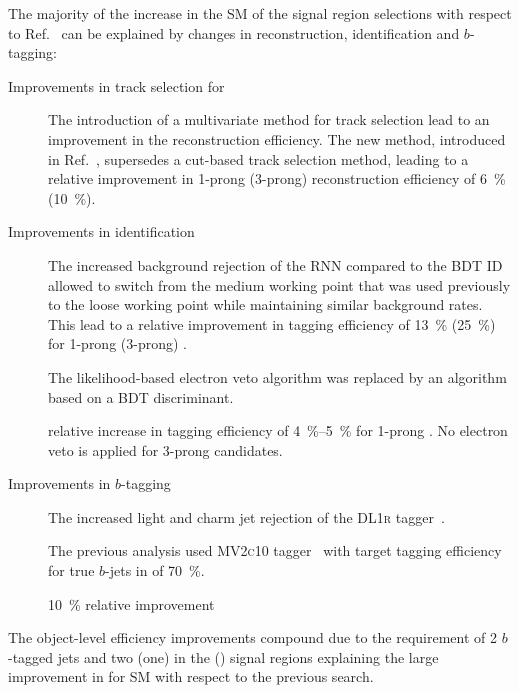 The majority of the increase in the SM \HH \AccTimesEff of the signal
region selections with respect to Ref.~\cite{HIGG-2016-16-witherratum}
can be explained by changes in \tauhadvis reconstruction,
identification and $b$-tagging:
\begin{description}

\item[Improvements in track selection for \tauhadvis] The introduction
  of a multivariate method for \tauhadvis track selection lead to an
  improvement in the \tauhadvis reconstruction efficiency. The new
  method, introduced in Ref.~\cite{duschinger}, supersedes a cut-based
  track selection method, leading to a relative improvement in 1-prong
  (3-prong) \tauhadvis reconstruction efficiency of \SI{6}{\percent}
  (\SI{10}{\percent}).

\item[Improvements in \tauhadvis identification]
  The increased background rejection of the RNN \tauid compared to the
  BDT ID allowed to switch from the medium working point that was used
  previously to the loose working point while maintaining similar
  background rates. This lead to a relative improvement in \tauhadvis
  tagging efficiency of \SI{13}{\percent} (\SI{25}{\percent}) for
  1-prong (3-prong) \tauhadvis.

  The likelihood-based electron veto algorithm was replaced by an
  algorithm based on a BDT discriminant.


  relative increase in tagging
  efficiency of \SIrange{4}{5}{\percent} for 1-prong \tauhadvis. No
  electron veto is applied for 3-prong \tauhadvis candidates.

\item[Improvements in $b$-tagging]

  The increased light and charm jet rejection of the \textsc{DL1r}
  tagger~\cite{ATL-PHYS-PUB-2017-013}.

  The previous analysis used \textsc{MV2c10}
  tagger~\cite{ATL-PHYS-PUB-2016-012} with target tagging efficiency
  for true $b$-jets in \ttbar of \SI{70}{\percent}.

  \SI{10}{\percent} relative improvement
\end{description}
The object-level efficiency improvements compound due to the
requirement of 2 $b$-tagged jets and two (one) \tauhadvis in the
\hadhad (\lephad) signal regions explaining the large improvement in
\AccTimesEff for SM \HH with respect to the previous
search.

